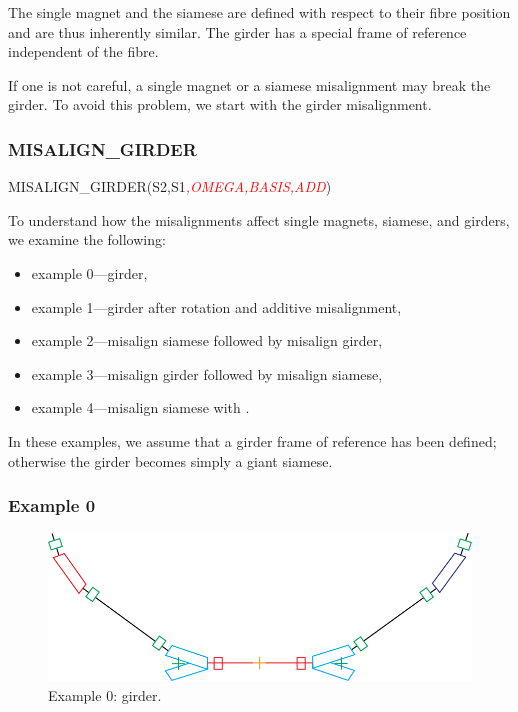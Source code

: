 The single magnet and the siamese are defined with respect to their
fibre position and are thus inherently similar. The girder has a special
frame of reference independent of the fibre.

If one is not careful, a single magnet or a siamese misalignment may
break the girder. To avoid this problem, we start with the girder misalignment.


\subsubsection{MISALIGN_GIRDER}

%
\begin{ptccode}
MISALIGN_GIRDER(S2,S1\textit{\textcolor{red}{,OMEGA,BASIS,ADD}})
\end{ptccode}

To understand how the misalignments affect single magnets, siamese, 
and girders, we examine the following:
\begin{itemize}
  \item example 0---girder,
  \item example 1---girder after rotation and additive misalignment,
  \item example 2---misalign siamese followed by misalign girder,
  \item example 3---misalign girder followed by misalign siamese,
  \item example 4---misalign siamese with .
\end{itemize}

In these examples, we assume that a girder frame of reference has been defined;
otherwise the girder becomes simply a giant siamese.


\subsubsection*{Example 0}

\begin{figure}[ht]
  \centering
  \includegraphics[width=.9\textwidth]{illustrations/misalign-fig1}
  \caption{Example 0: girder.}
  \label{fig:Example-0}
\end{figure}

